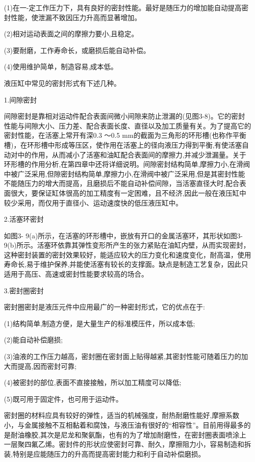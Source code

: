 \indent (1)在一-定工作压力下，具有良好的密封性能。最好是随压力的增加能自动提高密封性能，使泄漏不致因压力升高而显著增加。

\indent (2)相对运动表面之间的摩擦力要小,且稳定。

\indent (3)要耐磨，工作寿命长，或磨损后能自动补偿。

\indent (4)使用维护简单，制造容易,成本低。

\indent 液压缸中常见的密封形式有下述几种。

\indent 1.间隙密封

\indent 间隙密封是靠相对运动件配合表面间微小间隙来防止泄漏的(见图3-8)。它的密封性能与间隙大小、压力差、配合表面长度、直径以及加工质量有关。为了提高它的密封性能，在活塞上常开有深0.3 ～0.5 mm的截面为三角形的环形槽(也称作平衡槽)，在环形槽中形成等压区，使作用在活塞上的径向液压力得到平衡,有使活塞自动对中的作用，从而减小了活塞和油缸配合表面间的摩擦力,并减少泄漏量。关于环形槽的作用分析,在第四章中还将详细说明。间隙密封结构简单,摩擦力小,在滑阀中被广泛采用,但隙密封结构简单,摩擦力小,在滑阀中被广泛采用,但是其密封性能不能随压力的增大而提高，且磨损后不能自动补偿间隙，当活塞直径大时,配合表面很大，要保证缸体很高的加工精度有一定困难，且不经济,因此一般在液压缸中较少采用，而仅用于直径小、运动速度快的低压液压缸中。

\indent 2.活塞环密封

\indent 如图3- 9(a)所示，在活塞的环形槽中，嵌放有开口的金属活塞环，其形状如图3-9(b)所示。活塞环依靠其弹性变形所产生的张力紧贴在油缸内壁，从而实现密封，这种密封装置的密封效果较好，能适应较大的压力变化和速度变化，耐高温，使用寿命长,易于维护保养,并能使活塞有较长的支撑面。缺点是制造工艺复杂，因此只适用于高压、高速或密封性能要求较高的场合。

\indent 3.密封圈密封

\indent 密封圈密封是液压元件中应用最广的一种密封形式，它的优点在于:

\indent (1)结构简单,制造方便，是大量生产的标准模压件，所以成本低;

\indent (2)能自动补偿磨损;

\indent (3)油液的工作压力越高，密封圈在密封面上贴得越紧,其密封性能可随着压力的加大而提高,因而密封可靠;

\indent (4)被密封的部位,表面不直接接触，所以加工精度可以降低;

\indent (5)既可用于固定件，也可用于运动件。

\indent 密封圈的材料应具有较好的弹性，适当的机械强度，耐热耐磨性能好,摩擦系数小，与金属接触不互相黏着和腐蚀，与液压油有很好的“相容性”。目前用得最多的是耐油橡胶,其次是尼龙和聚氨酯，也有的为了增加耐磨性，在密封圈表面喷涂上一层聚四氟乙烯。密封件的形状应使密封可靠、耐久，摩擦阻力小，容易制造和拆装,特别是应能随压力的升高而提高密封能力和利于自动补偿磨损。

